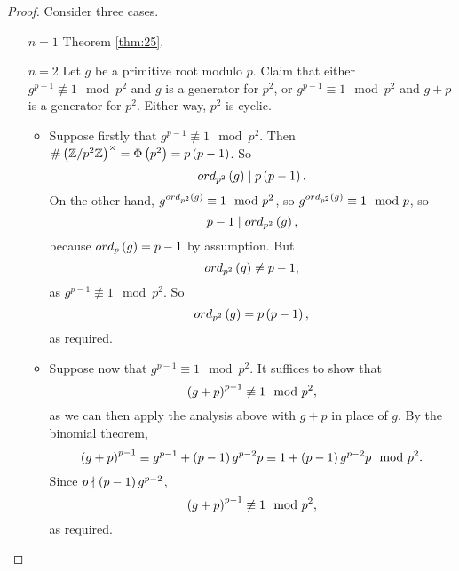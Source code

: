 \begin{proof}
Consider three cases.
\begin{itemize}[leftmargin=0.5in]
\item[$ n = 1 $] Theorem \ref{thm:25}.
\item[$ n = 2 $] Let $ g $ be a primitive root modulo $ p $. Claim that either $ g^{p - 1} \not\equiv 1 \mod p^2 $ and $ g $ is a generator for $ \unit{p^2} $, or $ g^{p - 1} \equiv 1 \mod p^2 $ and $ g + p $ is a generator for $ \unit{p^2} $. Either way, $ \unit{p^2} $ is cyclic.
\begin{itemize}
\item Suppose firstly that $ g^{p - 1} \not\equiv 1 \mod p^2 $. Then $ \#\unit{p^2} = \Phi\br{p^2} = p\br{p - 1} $. So
$$ ord_{p^2}\br{g} \mid p\br{p - 1}. $$
On the other hand, $ g^{ord_{p^2}\br{g}} \equiv 1 \mod p^2 $, so $ g^{ord_{p^2}\br{g}} \equiv 1 \mod p $, so
$$ p - 1 \mid ord_{p^2}\br{g}, $$
because $ ord_p\br{g} = p - 1 $ by assumption. But
$$ ord_{p^2}\br{g} \ne p - 1, $$
as $ g^{p - 1} \not\equiv 1 \mod p^2 $. So
$$ ord_{p^2}\br{g} = p\br{p - 1}, $$
as required.
\item Suppose now that $ g^{p - 1} \equiv 1 \mod p^2 $. It suffices to show that
$$ \br{g + p}^{p - 1} \not\equiv 1 \mod p^2, $$
as we can then apply the analysis above with $ g + p $ in place of $ g $. By the binomial theorem,
$$ \br{g + p}^{p - 1} \equiv g^{p - 1} + \br{p - 1}g^{p - 2}p \equiv 1 + \br{p - 1}g^{p - 2}p \mod p^2. $$
Since $ p \nmid \br{p - 1}g^{p - 2} $,
$$ \br{g + p}^{p - 1} \not\equiv 1 \mod p^2, $$
as required.
\end{itemize}

\pagebreak


\end{itemize}
\end{proof}
